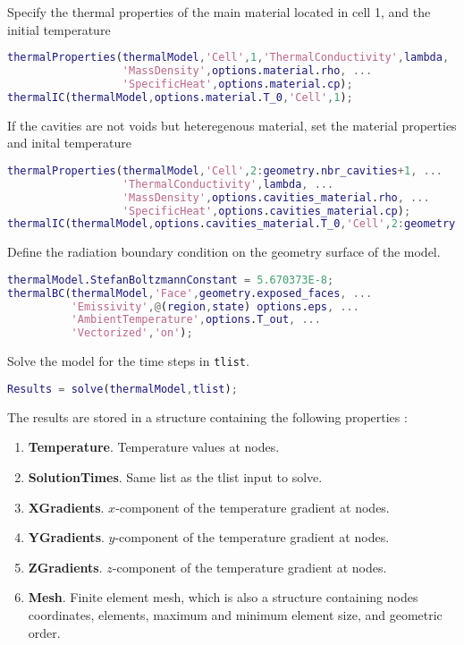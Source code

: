 \medskip
Specify the thermal properties of the main material located in cell 1, and the initial temperature 

\begin{lstlisting}[language=Matlab]
thermalProperties(thermalModel,'Cell',1,'ThermalConductivity',lambda, ...
                  'MassDensity',options.material.rho, ...
                  'SpecificHeat',options.material.cp);
thermalIC(thermalModel,options.material.T_0,'Cell',1);
\end{lstlisting}

\medskip
If the cavities are not voids but heteregenous material, set the material properties and inital temperature

\begin{lstlisting}[language=Matlab]
thermalProperties(thermalModel,'Cell',2:geometry.nbr_cavities+1, ...
                  'ThermalConductivity',lambda, ...
                  'MassDensity',options.cavities_material.rho, ...
                  'SpecificHeat',options.cavities_material.cp);
thermalIC(thermalModel,options.cavities_material.T_0,'Cell',2:geometry.nbr_cavities+1);
\end{lstlisting}

\medskip
Define the radiation boundary condition on the geometry surface of the model.

\begin{lstlisting}[language=Matlab]
thermalModel.StefanBoltzmannConstant = 5.670373E-8;
thermalBC(thermalModel,'Face',geometry.exposed_faces, ...
          'Emissivity',@(region,state) options.eps, ...
          'AmbientTemperature',options.T_out, ...
          'Vectorized','on');
\end{lstlisting}

\medskip
Solve the model for the time steps in \texttt{tlist}.

\begin{lstlisting}[language=Matlab]
Results = solve(thermalModel,tlist);
\end{lstlisting}

\medskip
The results are stored in a structure containing the following properties : 
\begin{enumerate}
    \item \textbf{Temperature}. Temperature values at nodes.
    \item \textbf{SolutionTimes}. Same list as the tlist input to solve.
    \item \textbf{XGradients}. $x$-component of the temperature gradient at nodes.
    \item \textbf{YGradients}. $y$-component of the temperature gradient at nodes.
    \item \textbf{ZGradients}. $z$-component of the temperature gradient at nodes.
    \item \textbf{Mesh}. Finite element mesh, which is also a structure containing nodes coordinates, elements, maximum and minimum element size, and geometric order.
\end{enumerate}